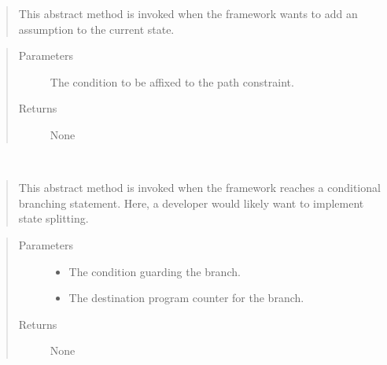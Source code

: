 \documentclass[letterpaper,10pt,english]{sphinxmanual}
\begin{document}
\begin{fulllineitems}
\begin{fulllineitems}
\begin{quote}
\sphinxAtStartPar
This abstract method is invoked when the framework wants to add an assumption to the current state.
\end{quote}
\begin{quote}\begin{description}
\item[{Parameters}] \leavevmode
\sphinxAtStartPar
{} \textendash{} The condition to be affixed to the path constraint.

\item[{Returns}] \leavevmode
\sphinxAtStartPar
None

\end{description}\end{quote}

\end{fulllineitems}


\begin{fulllineitems}
\label{\detokenize{index:State.State.conditional_branch}}~\begin{quote}

\sphinxAtStartPar
This abstract method is invoked when the framework reaches a conditional branching statement. Here,
a developer would likely want to implement state splitting.
\end{quote}
\begin{quote}\begin{description}
\item[{Parameters}] \leavevmode\begin{itemize}
\item {} 
\sphinxAtStartPar
{} \textendash{} The condition guarding the branch.

\item {} 
\sphinxAtStartPar
{} \textendash{} The destination program counter for the branch.

\end{itemize}

\item[{Returns}] \leavevmode
\sphinxAtStartPar
None


\end{description}
\end{quote}
\end{fulllineitems}
\end{fulllineitems}
\end{document}

